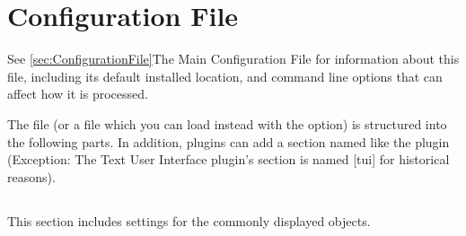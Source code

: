 

\chapter{Configuration File}
\label{sec:config.ini}
See \ref{sec:ConfigurationFile}{The
Main Configuration File} for information about this file, including its
default installed location, and command line options that can
affect how it is processed.


The file  (or a file which you can load instead with
the  option) is structured into the following
parts. In addition, plugins can add a section named like the plugin
(Exception: The Text User Interface plugin's section is named [tui]
for historical reasons).

\section{}
\label{sec:config.ini:astro}

This section includes settings for the commonly displayed objects.

